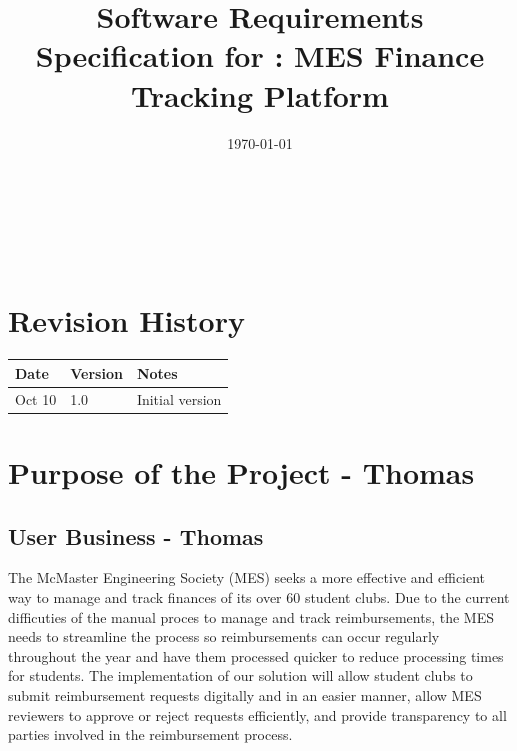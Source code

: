 \documentclass[12pt]{article}
\begin{document}
\title{Software Requirements Specification for \progname: MES Finance Tracking Platform} 
\author{\authname}
\date{\today}
	
\maketitle

~\newpage


\tableofcontents

~\newpage

\section*{Revision History}

\begin{tabularx}{\textwidth}{p{3cm}p{2cm}X}
  \toprule {\bf Date} & {\bf Version} & {\bf Notes}\\
    \midrule
      Oct 10 & 1.0 & Initial version\\
  \bottomrule
\end{tabularx}

\newpage
{}


\section{Purpose of the Project - Thomas}
  \subsection{User Business - Thomas}
    The McMaster Engineering Society (MES) seeks a more effective and efficient way to manage and track finances of its over 60 student clubs. Due to the current difficuties of 
    the manual proces to manage and track reimbursements, the MES needs to streamline the process so reimbursements can occur regularly throughout the year and have them processed
    quicker to reduce processing times for students. The implementation of our solution will allow student clubs to submit reimbursement requests digitally and in an easier manner, 
    allow MES reviewers to approve or reject requests efficiently, and provide transparency to all parties involved in the reimbursement process. 
\end{document}
